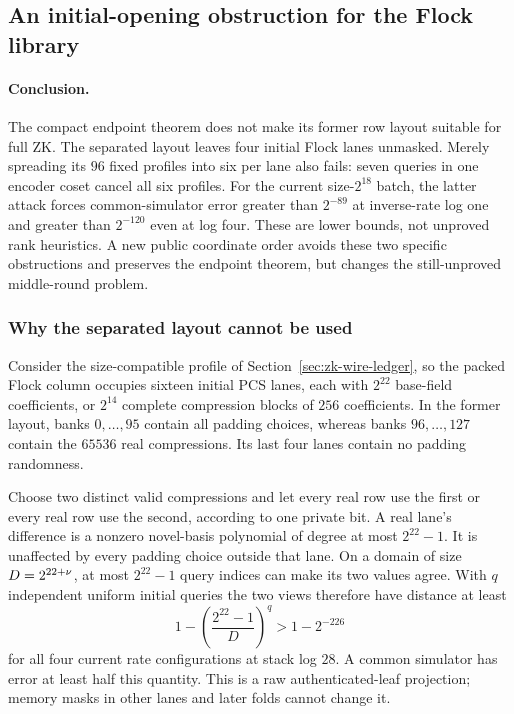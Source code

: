 \subsection{An initial-opening obstruction for the Flock library}\label{note:zk-flock-coset}

\paragraph{Conclusion.} The compact endpoint theorem does not make its former row layout suitable for full ZK. The separated layout leaves four initial Flock lanes unmasked. Merely spreading its $96$ fixed profiles into six per lane also fails: seven queries in one encoder coset cancel all six profiles. For the current size-$2^{18}$ batch, the latter attack forces common-simulator error greater than $2^{-89}$ at inverse-rate log one and greater than $2^{-120}$ even at log four. These are lower bounds, not unproved rank heuristics. A new public coordinate order avoids these two specific obstructions and preserves the endpoint theorem, but changes the still-unproved middle-round problem.

\subsubsection{Why the separated layout cannot be used}

Consider the size-compatible profile of Section~\ref{sec:zk-wire-ledger}, so the packed Flock column occupies sixteen initial PCS lanes, each with $2^{22}$ base-field coefficients, or $2^{14}$ complete compression blocks of $256$ coefficients. In the former layout, banks $0,\ldots,95$ contain all padding choices, whereas banks $96,\ldots,127$ contain the $65536$ real compressions. Its last four lanes contain no padding randomness.

Choose two distinct valid compressions and let every real row use the first or every real row use the second, according to one private bit. A real lane's difference is a nonzero novel-basis polynomial of degree at most $2^{22}-1$. It is unaffected by every padding choice outside that lane. On a domain of size $D=2^{22+\nu}$, at most $2^{22}-1$ query indices can make its two values agree. With $q$ independent uniform initial queries the two views therefore have distance at least
\[
 1-\left(\frac{2^{22}-1}{D}\right)^q>1-2^{-226}
\]
for all four current rate configurations at stack log $28$. A common simulator has error at least half this quantity. This is a raw authenticated-leaf projection; memory masks in other lanes and later folds cannot change it.

